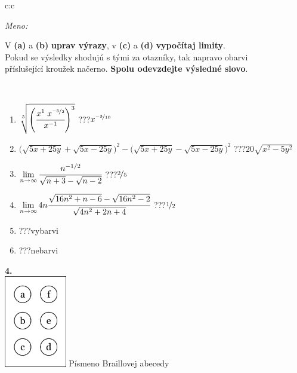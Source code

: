 \documentclass[10pt]{report}
\begin{document}
\begin{tabular}{c:c}
\begin{minipage}[c][104.5mm][t]{0.5\linewidth}
\begin{center}
\textit{Meno:}\phantom{xxxxxxxxxxxxxxxxxxxxxxxxxxxxxxxxxxxxxxxxxxxxxxxxxxxxxxxxxxxxxxxxx}\\[5mm]
\begin{minipage}{0.95\linewidth}
\begin{center}
V \textbf{(a)} a \textbf{(b)} \textbf{uprav výrazy}, v \textbf{(c)} a \textbf{(d)} \textbf{vypočítaj limity}.\\Pokud se výsledky shodujú s tými za otazníky, tak napravo obarvi\\příslušející kroužek načerno. \textbf{Spolu odevzdejte výsledné slovo}.
\end{center}
\end{minipage}
\\[1mm]
\begin{minipage}{0.79\linewidth}
\begin{center}
\begin{varwidth}{\linewidth}
\begin{enumerate}
\small
\item $\sqrt[5]{\left(\cfrac{x^{1}\;x^{\nicefrac{-5}{2}}}{x^{-1}}\right)^{3}}$\quad \dotfill\; ???\;\dotfill \quad $x^{\nicefrac{-3}{10}}$
\item {\footnotesize{\scriptsize$\big(\sqrt{5x+25y}+\sqrt{5x-25y}\big)^2-\big(\sqrt{5x+25y}-\sqrt{5x-25y}\big)^2$}\quad \dotfill\; ???\;\dotfill \quad $20\sqrt{x^2-5y^2}$}
\item $\lim\limits_{n\to\infty}\cfrac{n^{-1/2}}{\sqrt{n+3}-\sqrt{n-2}}$\quad \dotfill\; ???\;\dotfill \quad $\nicefrac{2}{5}$
\item $\lim\limits_{n\to\infty}4n\cfrac{\sqrt{16n^2+n-6}-\sqrt{16n^2-2}}{\sqrt{4n^2+2n+4}}$\quad \dotfill\; ???\;\dotfill \quad $\nicefrac{1}{2}$
\item \quad \dotfill\; ???\;\dotfill \quad vybarvi
\item \quad \dotfill\; ???\;\dotfill \quad nebarvi
\end{enumerate}
\end{varwidth}
\end{center}
\end{minipage}
\begin{minipage}{0.20\linewidth}
\begin{center}
{\Huge\bfseries 4.} \\[2mm]
\includegraphics[height=40mm]{../images/braille.png}
{\small Písmeno Braillovej abecedy}
\end{center}
\end{minipage}
\end{center}
\end{minipage}
%
\end{tabular}
\end{document}
